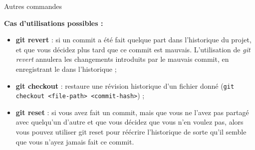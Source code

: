 \documentclass[9pt]{beamer}
\begin{document}
    \begin{frame}[fragile]{Autres commandes}

    \textbf{Cas d'utilisations possibles :}

        \begin{itemize}
            \item \textbf{git revert} : si un commit a été fait quelque part dans l'historique du projet, et que vous décidez plus tard que ce commit est mauvais. L'utilisation de \textit{git revert} annulera les changements introduits par le mauvais commit, en enregistrant le  dans l'historique ;
            \item \textbf{git checkout} : restaure une révision historique d'un fichier donné (\texttt{git checkout <file-path> <commit-hash>}) ;
            \item \textbf{git reset} : si vous avez fait un commit, mais que vous ne l'avez pas partagé avec quelqu'un d'autre et que vous décidez que vous n'en voulez pas, alors vous pouvez utiliser git reset pour réécrire l'historique de sorte qu'il semble que vous n'ayez jamais fait ce commit. 
        \end{itemize}

    \end{frame}
	
\end{document}
